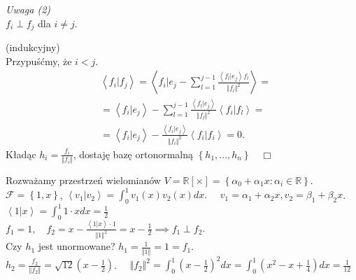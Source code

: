 \documentclass[../main.tex]{subfiles}
\begin{document}
        \textit{Uwaga (2)}\\
        $f_i \perp f_j$ dla $i \neq j$.
        \begin{dowod}
            (indukcyjny)\\
            Przypuśćmy, że $i<j$.\\
            \begin{align*}
                &\left< f_i | f_j \right> = \left< f_i | e_j - \sum_{l=1}^{j-1} \frac{\left< f_l | e_j \right> f_l}{\Vert f_l \Vert ^2} \right> =\\
                &=\left<f_i|e_j \right> - \sum_{l=1}^{j-1} \frac{\left<f_l|e_j \right>}{\Vert f_l \Vert ^2} \left<f_i | f_l \right> =\\
                &=  \left<f_i|e_j \right> - \frac{\left<f_i|e_j \right>}{\Vert f_i \Vert ^2} \left<f_i | f_i \right> = 0
            .\end{align*}
            Kładąc $h_i = \frac{f_i}{\Vert f_i \Vert }$, dostaję bazę ortonormalną $\left\{ h_1,\ldots,h_n \right\} \quad\Box$
        \end{dowod}
        \begin{przyklad}
            Rozważamy przestrzeń wielomianów $V = \mathbb{R}[\times] = \left\{ \alpha_0 + \alpha_1x : \alpha_i \in \mathbb{R} \right\} $.\\
            $\mathcal{F} = \left\{ 1,x \right\} $, $\left<v_1|v_2 \right> = \int_0^1 v_1(x)v_2(x)dx.$ $\quad v_1 = \alpha_1 + \alpha_2x, v_2 = \beta_1 + \beta_2x$.\\
$\left<1|x \right> = \int_0^1 1 \cdot x dx = \frac{1}{2}$ \\
$f_1 = 1,\quad f_2 = x - \frac{\left<1|x \right> \cdot 1}{\Vert 1 \Vert ^2} = x-\frac{1}{2} \implies f_1\perp f_2$.\\
Czy $h_1$ jest unormowane? $h_1 = \frac{1}{\Vert 1 \Vert } = 1 = f_1$.\\
$h_2 = \frac{f_2}{\Vert f_2 \Vert } = \sqrt{12} (x-\frac{1}{2})$. $\quad \Vert f_2 \Vert ^2 = \int_0^1 (x-\frac{1}{2})^2 dx = \int_0^1 (x^2 - x + \frac{1}{4})dx = \frac{1}{12}$
        \end{przyklad}
\end{document}
